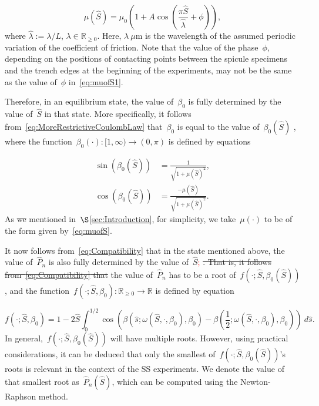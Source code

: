 \documentclass[preprint,10pt,times]{elsarticle}
\numberwithin{equation}{section}
\newcommand{\pr}[1]{\left( #1 \right)}
\begin{document}
\begin{equation}
\mu\pr{\hat{S}}=\mu_{0}\left(1+A\cos\left(\frac{ \pi \hat{S}}{\hat{\lambda}}+\phi\right)\right),\label{eq:muofS}
\end{equation}
where $\hat{\lambda}:=\lambda/L$, $\lambda \in \mathbb{R}_{\ge0}$. Here, $\lambda~\mu$m is the wavelength of the assumed periodic variation of the coefficient of friction. Note that the value of the phase~$\phi$, depending on the positions
of contacting points between the spicule specimens and the trench
edges at the beginning of the experiments, may not be the same as
the value of~$\phi$ in~\eqref{eq:muofS1}.

Therefore, in an equilibrium state, the value of~$\beta_0$ is fully
determined by the value of~$\hat{S}$ in that state. More specifically,
it follows from~\eqref{eq:MoreRestrictiveCoulombLaw} that~$\beta_0$
is equal to the value of~$\beta_0\pr{\hat{S}}$ , where the function~$\beta_0(\cdot):[1,\infty)\to (0,\pi)$
is defined by equations

\begin{subequations}
\begin{align}
\sin\pr{\beta_0\pr{\hat{S}}}&=\frac{1}{\sqrt{1+\mu\pr{\hat{S}}^2}},\\
\cos\pr{\beta_0\pr{\hat{S}}}&=\frac{-\mu\pr{\hat{S}}}{\sqrt{1+\mu\pr{\hat{S}}^2}}.
\end{align}
\label{eq:FrictionLaw}
\end{subequations}As \sout{we }mentioned in~$\S$\ref{sec:Introduction}, for simplicity,
we take~$\mu(\cdot)$ to be of the form given by~\eqref{eq:muofS}.

It now follows from~\eqref{eq:Compatibility} that in the state mentioned
above, the value of~$\hat{P}_n$ is also fully determined by the
value of~$\hat{S}$\textcolor{red}; \sout{. That is, it follows from~\eqref{eq:Compatibility}
that} the value of~$\hat{P}_n$ has to be a root of~$f\pr{\cdot;\hat{S},\beta_0\pr{\hat{S}}}$,
and the function~$f\left(\cdot;\hat{S},\beta_0\right):\mathbb{R}_{\ge 0}\to\mathbb{R}$
is defined by equation

\begin{equation}
f\left(\ensuremath{\cdot};\hat{S},\beta_0\right)=1-2\hat{S}\int_{0}^{1/2}\cos\left(\beta\left(\hat{s};\omega(\hat{S},\cdot,\beta_{0}),\beta_{0}\right)-\beta\left(\frac{1}{2};\omega(\hat{S},\cdot,\beta_{0}),\beta_{0}\right)\right)\ d\hat{s}.
\label{eq:ClosingEquation}
\end{equation}
In general,~$f\pr{\cdot;\hat{S},\beta_0\pr{\hat{S}}}$ will have multiple
roots. However, using practical considerations, it can be deduced
that only the smallest of~$f\pr{\cdot;\hat{S},\beta_0\pr{\hat{S}}}$'s
roots is relevant in the context of the SS experiments. We denote
the value of that smallest root as~$\hat{P}_n\pr{\hat{S}}$, which
can be computed using the Newton-Raphson method.
\end{document}
